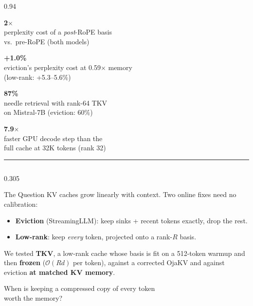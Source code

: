 \documentclass[final]{beamer}
\newcommand{\takeaway}[1]{%
  \begin{center}
  \colorbox{soft}{\parbox{0.96\linewidth}{\vspace{0.35cm}\centering\large #1\vspace{0.35cm}}}
  \end{center}}
\newcommand{\stat}[3]{%
  \begin{minipage}[t]{0.235\linewidth}\centering
    {\fontsize{76}{76}\selectfont\bfseries\color{#1}#2}\\[0.4cm]
    {\large #3}
  \end{minipage}}
\begin{document}
\begin{frame}[t]
\vspace{0.5cm}

\begin{columns}[t]
\begin{column}{0.94\paperwidth}
\stat{accent}{2$\times$}{perplexity cost of a \emph{post}-RoPE basis\\ vs.\ pre-RoPE (both models)}\hfill
\stat{teal}{+1.0\%}{eviction's perplexity cost at 0.59$\times$ memory\\ (low-rank: +5.3--5.6\%)}\hfill
\stat{accent}{87\%}{needle retrieval with rank-64 TKV\\ on Mistral-7B (eviction: 60\%)}\hfill
\stat{good}{7.9$\times$}{faster GPU decode step than the\\ full cache at 32K tokens (rank 32)}
\par\vspace{0.4cm}
{\color{muted!40}\rule{\linewidth}{2pt}}
\end{column}
\end{columns}

\vspace{0.4cm}

\begin{columns}[t]
\begin{column}{0.305\paperwidth}

\begin{block}{The Question}
KV caches grow linearly with context. Two online fixes need no calibration:
\vspace{0.2cm}
\begin{itemize}
  \item \textbf{Eviction} (StreamingLLM): keep sinks + recent tokens exactly, drop the rest.
  \item \textbf{Low-rank}: keep \emph{every} token, projected onto a rank-$R$ basis.
\end{itemize}
\vspace{0.2cm}
We tested \textbf{TKV}, a low-rank cache whose basis is fit on a 512-token
warmup and then \textbf{frozen} ($\mathcal{O}(Rd)$ per token), against a
corrected OjaKV and against eviction \textbf{at matched KV memory}.
\takeaway{When is keeping a compressed copy of every token\\ worth the memory?}
\end{block}


\end{column}
\end{columns}
\end{frame}
\end{document}
